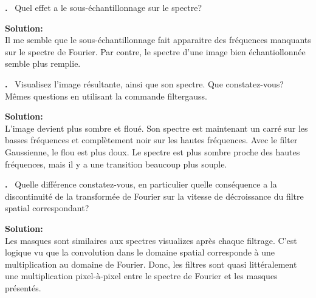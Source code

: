 \documentclass{article}
\newcounter{problem}
\newcounter{solution}
\newcommand\Problem{%
  \stepcounter{problem}%
  \textbf{\theproblem.}~%
  \setcounter{solution}{0}%
}
\newcommand\Solution{%
  \textbf{Solution:}\\%
}
\begin{document}
\Problem Quel effet a le sous-échantillonnage sur le spectre?

\Solution Il me semble que le sous-échantillonnage fait apparaitre des fréquences manquants sur le spectre de Fourier.
Par contre, le spectre d'une image bien échantiollonnée semble plus remplie.

\Problem Visualisez l'image résultante, ainsi que son spectre. Que constatez-vous? Mêmes questions en utilisant la commande filtergauss.

\Solution L'image devient plus sombre et floué. Son spectre est maintenant un carré sur les basses fréquences et complètement noir sur les hautes fréquences.
Avec le filter Gaussienne, le flou est plus doux. Le spectre est plus sombre proche des hautes fréquences, mais il y a une transition beaucoup plus souple.

\Problem Quelle différence constatez-vous, en particulier quelle conséquence a la discontinuité de la transformée de Fourier sur la vitesse de décroissance du filtre spatial correspondant?

\Solution Les masques sont similaires aux spectres visualizes après chaque filtrage. C'est logique vu que la convolution dans le domaine spatial corresponde à une multiplication au domaine de Fourier.
Donc, les filtres sont quasi littéralement une multiplication pixel-à-pixel entre le spectre de Fourier et les masques présentés.
\end{document}
